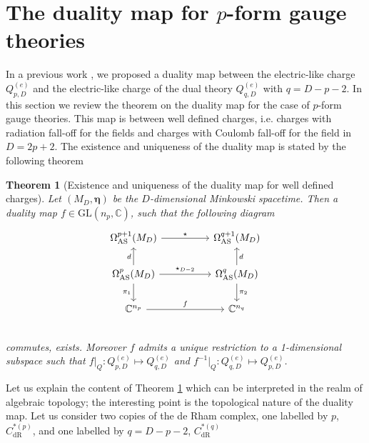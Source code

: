 \documentclass[a4paper,12pt]{article}
\newtheorem{Theorem}{Theorem}[section]
\begin{document}
\section{The duality map for $p$-form gauge theories}\label{dualitymap}

In a previous work \cite{Manzoni:2024tow}, we proposed a duality map between the electric-like charge $Q^{(e)}_{p,D}$ and the electric-like charge of the dual theory $Q^{(e)}_{q,D}$ with $q=D-p-2$.
In this section we review the theorem on the duality map for the case of $p$-form gauge theories.
This map is between well defined charges, i.e. charges with radiation fall-off for the fields and charges with Coulomb fall-off for the field in $D=2p+2$. The existence and uniqueness of the duality map is stated by the following theorem
\begin{Theorem}[Existence and uniqueness of the duality map for well defined charges]\label{THM3.1} 
Let $(M_D,\boldsymbol{\eta})$ be the $D$-dimensional Minkowski spacetime. Then a duality map $f \in \mathrm{GL}(n_p,\mathbb{C})$, such that the following diagram
\begin{equation}
\centering
\begin{tikzcd}
\Omega_{\mathrm{AS}}^{p+1}(M_D) \arrow[rr, "\star"] & & \Omega_{\mathrm{AS}}^{q+1}(M_D)\\
\Omega_{\mathrm{AS}}^{p}(M_D) \arrow[u, "d"] \arrow[d, "\pi_1", swap ] \arrow[rr, "\star_{D-2}"] & & \Omega_{\mathrm{AS}}^{q}(M_D) \arrow[u, "d", swap] \arrow[d, "\pi_2"]\\
\mathbb{C}^{n_p}  \arrow[rr, "f"] & & \mathbb{C}^{n_{q}} \\
\end{tikzcd}
\end{equation}
commutes, exists. Moreover $f$ admits a unique restriction to a 1-dimensional subspace such that $f|_{Q}: Q^{(e)}_{p,D} \mapsto Q_{q,D}^{(e)}$ and $f^{-1}|_{Q}: Q^{(e)}_{q,D} \mapsto Q^{(e)}_{p,D}$.
\end{Theorem}
Let us explain the content of Theorem \ref{THM3.1} which can be interpreted in the realm of algebraic topology; the interesting point is the topological nature of the duality map. Let us consider two copies of the de Rham complex, one labelled by $p$, $C_{\text{dR}}^{*(p)}$, and one labelled by $q=D-p-2$, $C_{\text{dR}}^{*(q)}$
\end{document}
